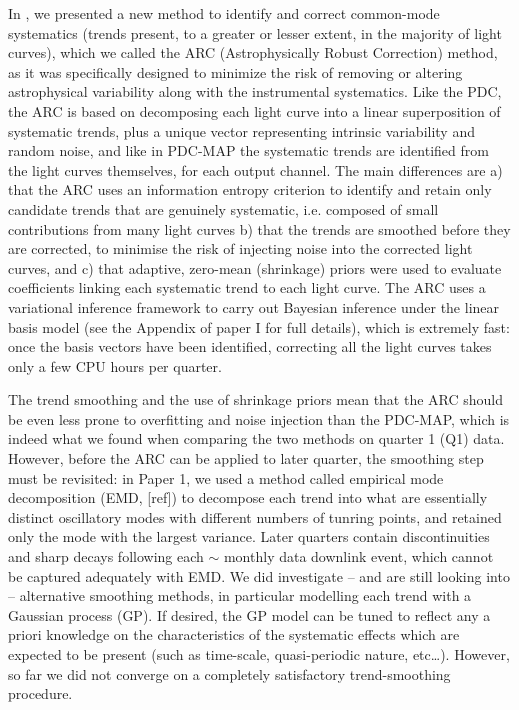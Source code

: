\documentclass[useAMS,usenatbib]{mn2e}
\begin{document}
In \citet[][hereafter Paper I]{rob+13}, we presented a new method to
identify and correct common-mode systematics (trends present, to a
greater or lesser extent, in the majority of light curves), which we
called the ARC (Astrophysically Robust Correction) method, as it was
specifically designed to minimize the risk of removing or altering
astrophysical variability along with the instrumental
systematics. Like the PDC, the ARC is based on decomposing each light
curve into a linear superposition of systematic trends, plus a unique
vector representing intrinsic variability and random noise, and like
in PDC-MAP the systematic trends are identified from the light curves
themselves, for each output channel. The main differences are a) that
the ARC uses an information entropy criterion to identify and retain
only candidate trends that are genuinely systematic, i.e. composed of
small contributions from many light curves b) that the trends are
smoothed before they are corrected, to minimise the risk of
injecting noise into the corrected light curves, and c) that adaptive,
zero-mean (shrinkage) priors were used to evaluate coefficients
linking each systematic trend to each light curve. The ARC uses a
variational inference framework to carry out Bayesian inference under the linear basis
model (see the Appendix of paper I for full details), which is
extremely fast: once the basis vectors have been identified,
correcting all the light curves takes only a few CPU hours per quarter.

The trend smoothing and the use of shrinkage priors mean that the ARC should be
even less prone to overfitting and noise injection than the PDC-MAP,
which is indeed what we found when comparing the two methods on
quarter 1 (Q1) data. However, before the ARC can be applied to later
quarter, the smoothing step must be revisited: in Paper 1, we used a
method called empirical mode decomposition (EMD, [ref]) to decompose
each trend into what are essentially distinct oscillatory modes with
different numbers of tunring points, and retained only the mode with
the largest variance. Later quarters contain discontinuities and sharp
decays following each $\sim$ monthly data downlink event, which cannot
be captured adequately with EMD. We did investigate -- and are still
looking into -- alternative smoothing methods, in particular
modelling each trend with a Gaussian process (GP). If desired, the GP
model can be tuned to reflect any a priori knowledge on the
characteristics of the systematic effects which are expected to be
present (such as time-scale, quasi-periodic nature,
etc\ldots). However, so far we did not converge on a completely
satisfactory trend-smoothing procedure.
\end{document}
